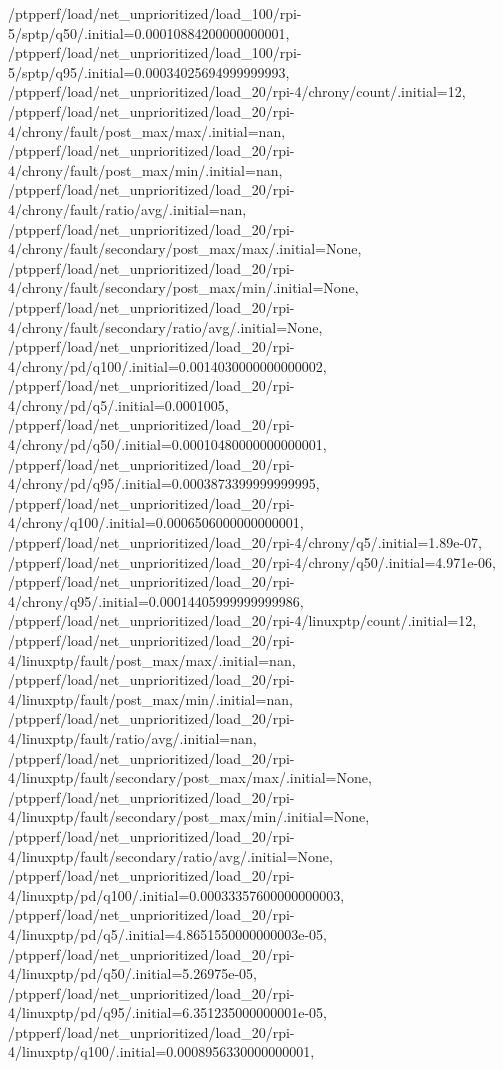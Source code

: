 {    /ptpperf/load/net_unprioritized/load_100/rpi-5/sptp/q50/.initial=0.00010884200000000001,
    /ptpperf/load/net_unprioritized/load_100/rpi-5/sptp/q95/.initial=0.00034025694999999993,
    /ptpperf/load/net_unprioritized/load_20/rpi-4/chrony/count/.initial=12,
    /ptpperf/load/net_unprioritized/load_20/rpi-4/chrony/fault/post_max/max/.initial=nan,
    /ptpperf/load/net_unprioritized/load_20/rpi-4/chrony/fault/post_max/min/.initial=nan,
    /ptpperf/load/net_unprioritized/load_20/rpi-4/chrony/fault/ratio/avg/.initial=nan,
    /ptpperf/load/net_unprioritized/load_20/rpi-4/chrony/fault/secondary/post_max/max/.initial=None,
    /ptpperf/load/net_unprioritized/load_20/rpi-4/chrony/fault/secondary/post_max/min/.initial=None,
    /ptpperf/load/net_unprioritized/load_20/rpi-4/chrony/fault/secondary/ratio/avg/.initial=None,
    /ptpperf/load/net_unprioritized/load_20/rpi-4/chrony/pd/q100/.initial=0.0014030000000000002,
    /ptpperf/load/net_unprioritized/load_20/rpi-4/chrony/pd/q5/.initial=0.0001005,
    /ptpperf/load/net_unprioritized/load_20/rpi-4/chrony/pd/q50/.initial=0.00010480000000000001,
    /ptpperf/load/net_unprioritized/load_20/rpi-4/chrony/pd/q95/.initial=0.0003873399999999995,
    /ptpperf/load/net_unprioritized/load_20/rpi-4/chrony/q100/.initial=0.0006506000000000001,
    /ptpperf/load/net_unprioritized/load_20/rpi-4/chrony/q5/.initial=1.89e-07,
    /ptpperf/load/net_unprioritized/load_20/rpi-4/chrony/q50/.initial=4.971e-06,
    /ptpperf/load/net_unprioritized/load_20/rpi-4/chrony/q95/.initial=0.00014405999999999986,
    /ptpperf/load/net_unprioritized/load_20/rpi-4/linuxptp/count/.initial=12,
    /ptpperf/load/net_unprioritized/load_20/rpi-4/linuxptp/fault/post_max/max/.initial=nan,
    /ptpperf/load/net_unprioritized/load_20/rpi-4/linuxptp/fault/post_max/min/.initial=nan,
    /ptpperf/load/net_unprioritized/load_20/rpi-4/linuxptp/fault/ratio/avg/.initial=nan,
    /ptpperf/load/net_unprioritized/load_20/rpi-4/linuxptp/fault/secondary/post_max/max/.initial=None,
    /ptpperf/load/net_unprioritized/load_20/rpi-4/linuxptp/fault/secondary/post_max/min/.initial=None,
    /ptpperf/load/net_unprioritized/load_20/rpi-4/linuxptp/fault/secondary/ratio/avg/.initial=None,
    /ptpperf/load/net_unprioritized/load_20/rpi-4/linuxptp/pd/q100/.initial=0.00033357600000000003,
    /ptpperf/load/net_unprioritized/load_20/rpi-4/linuxptp/pd/q5/.initial=4.8651550000000003e-05,
    /ptpperf/load/net_unprioritized/load_20/rpi-4/linuxptp/pd/q50/.initial=5.26975e-05,
    /ptpperf/load/net_unprioritized/load_20/rpi-4/linuxptp/pd/q95/.initial=6.351235000000001e-05,
    /ptpperf/load/net_unprioritized/load_20/rpi-4/linuxptp/q100/.initial=0.0008956330000000001,
}
